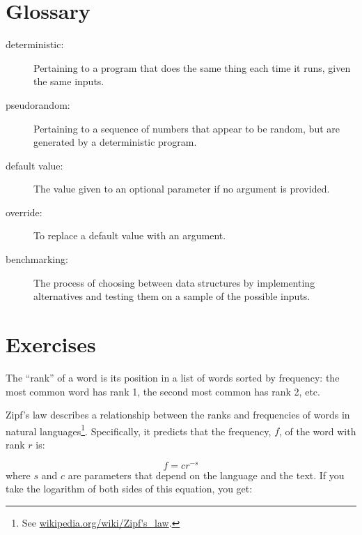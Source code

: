 \documentclass[10pt]{book}
\begin{document}
{\section{Glossary}

\begin{description}

\item[deterministic:] Pertaining to a program that does the same
thing each time it runs, given the same inputs.

\item[pseudorandom:] Pertaining to a sequence of numbers that appear
to be random, but are generated by a deterministic program.

\item[default value:] The value given to an optional parameter if no
argument is provided.

\item[override:] To replace a default value with an argument.

\item[benchmarking:] The process of choosing between data structures
by implementing alternatives and testing them on a sample of the
possible inputs.  

\end{description}


\section{Exercises}

\begin{ex}


The ``rank'' of a word is its position in a list of words
sorted by frequency: the most common word has rank 1, the
second most common has rank 2, etc.

Zipf's law describes a relationship between the ranks and frequencies
of words in natural languages\footnote{See
  \url{wikipedia.org/wiki/Zipf's_law}.}.  Specifically, it
predicts that the frequency, $f$, of the word with rank $r$ is:

\[ f = c r^{-s} \]
%
where $s$ and $c$ are parameters that depend on the language and the
text.  If you take the logarithm of both sides of this equation, you
get:



\end{ex}}
\end{document}

